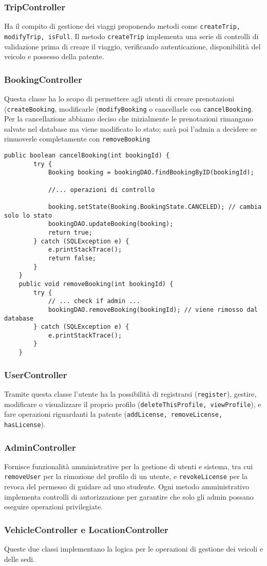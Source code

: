 \subsubsection{TripController}
Ha il compito di gestione dei viaggi proponendo metodi come \texttt{createTrip, modifyTrip, isFull}. 
Il metodo \texttt{createTrip} implementa una serie di controlli di validazione prima di creare il viaggio, verificando autenticazione, disponibilità del veicolo e possesso della patente.
\subsubsection{BookingController}
Questa classe ha lo scopo di permettere agli utenti di creare prenotazioni (\texttt{createBooking}, modificarle (\texttt{modifyBooking} o cancellarle con \texttt{cancelBooking}. Per la cancellazione abbiamo deciso che inizialmente le prenotazioni rimangano salvate nel database ma viene modificato lo stato; sarà poi l'admin a decidere se rimuoverle completamente con \texttt{removeBooking}
\begin{lstlisting}[style=Java, caption={Cancellazione e rimozione di una Prenotazione}]
    public boolean cancelBooking(int bookingId) {
        try {
            Booking booking = bookingDAO.findBookingByID(bookingId);
            
            //... operazioni di controllo

            booking.setState(Booking.BookingState.CANCELED); // cambia solo lo stato
            bookingDAO.updateBooking(booking); 
            return true;
        } catch (SQLException e) {
            e.printStackTrace();
            return false;
        }
    }
    public void removeBooking(int bookingId) {
        try {
            // ... check if admin ...
            bookingDAO.removeBooking(bookingId); // viene rimosso dal database
        } catch (SQLException e) {
            e.printStackTrace();
        }
    }
\end{lstlisting}
\subsubsection{UserController}
Tramite questa classe l'utente ha la possibilità di registrarsi (\texttt{register}), gestire, modificare o visualizzare il proprio profilo (\texttt{deleteThisProfile, viewProfile}), e fare operazioni riguardanti la patente (\texttt{addLicense, removeLicense, hasLicense}).
\subsubsection{AdminController}
Fornisce funzionalità amministrative per la gestione di utenti e sistema, tra cui \texttt{removeUser} per la rimozione del profilo di un utente, e \texttt{revokeLicense} per la revoca del permesso di guidare ad uno studente.
Ogni metodo amministrativo implementa controlli di autorizzazione per garantire che solo gli admin possano eseguire operazioni privilegiate.
\subsubsection{VehicleController e LocationController}
Queste due classi implementano la logica per le operazioni di gestione dei veicoli e delle sedi.
